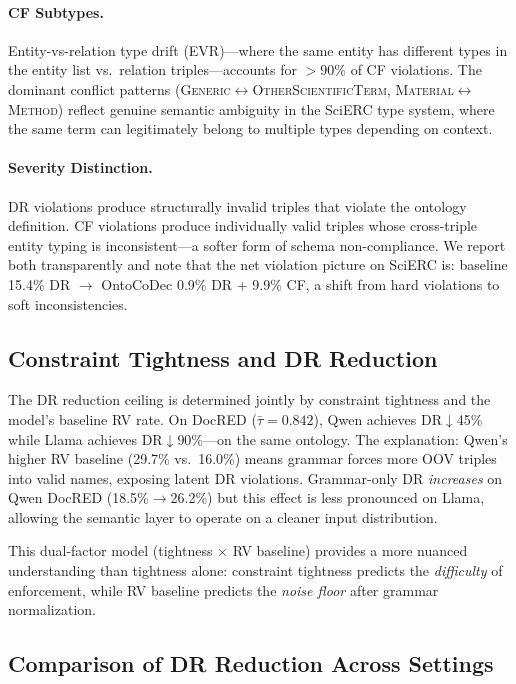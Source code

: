 \documentclass[11pt,a4paper]{article}
\newcommand{\method}{OntoCoDec}
\begin{document}
\paragraph{CF Subtypes.}
Entity-vs-relation type drift (EVR)---where the same entity has different types in the entity list vs.\ relation triples---accounts for $>$90\% of CF violations. The dominant conflict patterns (\textsc{Generic}$\leftrightarrow$\textsc{OtherScientificTerm}, \textsc{Material}$\leftrightarrow$\textsc{Method}) reflect genuine semantic ambiguity in the SciERC type system, where the same term can legitimately belong to multiple types depending on context.

\paragraph{Severity Distinction.}
DR violations produce structurally invalid triples that violate the ontology definition. CF violations produce individually valid triples whose cross-triple entity typing is inconsistent---a softer form of schema non-compliance. We report both transparently and note that the net violation picture on SciERC is: baseline 15.4\% DR $\to$ \method{} 0.9\% DR + 9.9\% CF, a shift from hard violations to soft inconsistencies.

\subsection{Constraint Tightness and DR Reduction}
\label{sec:tightness}

The DR reduction ceiling is determined jointly by constraint tightness and the model's baseline RV rate. On DocRED ($\bar{\tau}{=}0.842$), Qwen achieves DR$\downarrow$45\% while Llama achieves DR$\downarrow$90\%---on the same ontology. The explanation: Qwen's higher RV baseline (29.7\% vs.\ 16.0\%) means grammar forces more OOV triples into valid names, exposing latent DR violations. Grammar-only DR \emph{increases} on Qwen DocRED (18.5\%$\to$26.2\%) but this effect is less pronounced on Llama, allowing the semantic layer to operate on a cleaner input distribution.

This dual-factor model (tightness $\times$ RV baseline) provides a more nuanced understanding than tightness alone: constraint tightness predicts the \emph{difficulty} of enforcement, while RV baseline predicts the \emph{noise floor} after grammar normalization.

\subsection{Comparison of DR Reduction Across Settings}
\label{sec:dr_comparison}
\end{document}
